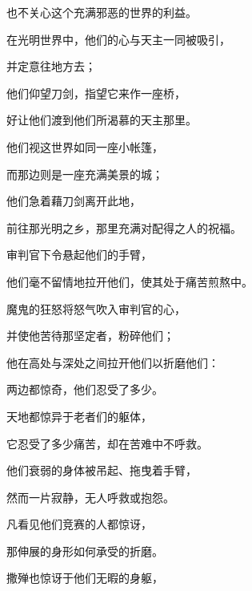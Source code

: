 也不关心这个充满邪恶的世界的利益。\par

在光明世界中，他们的心与天主一同被吸引，\par

并定意往地方去；\par

他们仰望刀剑，指望它来作一座桥，\par

好让他们渡到他们所渴慕的天主那里。\par

他们视这世界如同一座小帐篷，\par

而那边则是一座充满美景的城；\par

他们急着藉刀剑离开此地，\par

前往那光明之乡，那里充满对配得之人的祝福。\par

审判官下令悬起他们的手臂，\par

他们毫不留情地拉开他们，使其处于痛苦煎熬中。\par

魔鬼的狂怒将怒气吹入审判官的心，\par

并使他苦待那坚定者，粉碎他们；\par

他在高处与深处之间拉开他们以折磨他们：\par

两边都惊奇，他们忍受了多少。\par

天地都惊异于老者们的躯体，\par

它忍受了多少痛苦，却在苦难中不呼救。\par

他们衰弱的身体被吊起、拖曳着手臂，\par

然而一片寂静，无人呼救或抱怨。\par

凡看见他们竞赛的人都惊讶，\par

那伸展的身形如何承受的折磨。\par

撒殚也惊讶于他们无暇的身躯，\par

